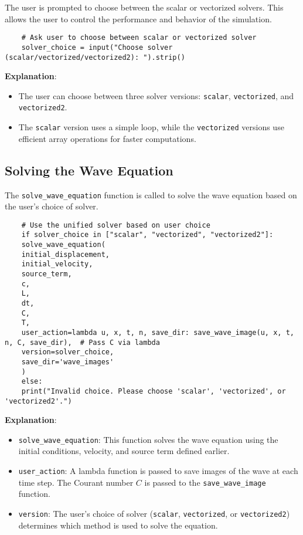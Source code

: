 \documentclass[a4paper, 11pt]{article}
\begin{document}
The user is prompted to choose between the scalar or vectorized solvers. This allows the user to control the performance and behavior of the simulation.

\lstset{language=Python}
\begin{lstlisting}
	# Ask user to choose between scalar or vectorized solver
	solver_choice = input("Choose solver (scalar/vectorized/vectorized2): ").strip()
\end{lstlisting}

\textbf{Explanation}:
\begin{itemize}
	\item The user can choose between three solver versions: \texttt{scalar}, \texttt{vectorized}, and \texttt{vectorized2}.
	\item The \texttt{scalar} version uses a simple loop, while the \texttt{vectorized} versions use efficient array operations for faster computations.
\end{itemize}

\subsection{Solving the Wave Equation}

The \texttt{solve\_wave\_equation} function is called to solve the wave equation based on the user’s choice of solver.

\lstset{language=Python}
\begin{lstlisting}
	# Use the unified solver based on user choice
	if solver_choice in ["scalar", "vectorized", "vectorized2"]:
	solve_wave_equation(
	initial_displacement, 
	initial_velocity, 
	source_term, 
	c, 
	L, 
	dt, 
	C, 
	T, 
	user_action=lambda u, x, t, n, save_dir: save_wave_image(u, x, t, n, C, save_dir),  # Pass C via lambda
	version=solver_choice,
	save_dir='wave_images'
	)
	else:
	print("Invalid choice. Please choose 'scalar', 'vectorized', or 'vectorized2'.")
\end{lstlisting}

\textbf{Explanation}:
\begin{itemize}
	\item \texttt{solve\_wave\_equation}: This function solves the wave equation using the initial conditions, velocity, and source term defined earlier.
	\item \texttt{user\_action}: A lambda function is passed to save images of the wave at each time step. The Courant number $C$ is passed to the \texttt{save\_wave\_image} function.
	\item \texttt{version}: The user’s choice of solver (\texttt{scalar}, \texttt{vectorized}, or \texttt{vectorized2}) determines which method is used to solve the equation.
\end{itemize}
\end{document}
